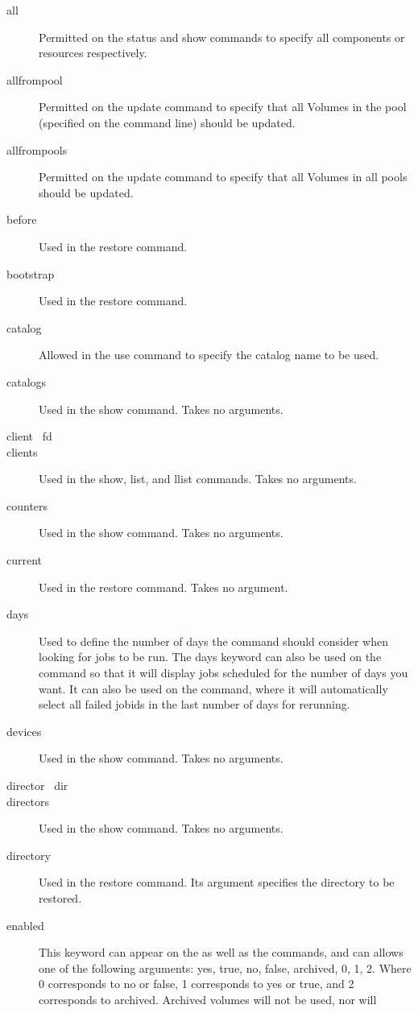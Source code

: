 \begin{description}
\item [all]
  Permitted on the status and show commands to specify all components or
  resources respectively.
\item [allfrompool]
  Permitted on the update command to specify that all Volumes in the
  pool (specified on the command line) should be updated.
\item [allfrompools]
  Permitted on the update command to specify that all Volumes in all
  pools should be updated.
\item [before]
  Used in the restore command.
\item [bootstrap]
  Used in the restore command.
\item [catalog]
  Allowed in the use command to specify the catalog name
  to be used.
\item [catalogs]
  Used in the show command. Takes no arguments.
\item [client \textbar\ fd]
\item [clients]
  Used in the show, list, and llist commands. Takes no arguments.
\item [counters]
  Used in the show command. Takes no arguments.
\item [current]
  Used in the restore command. Takes no argument.
\item [days]
  Used to define the number of days the  command
  should consider when looking for jobs to be run.  The days keyword
  can also be used on the  command so that it will display
  jobs scheduled for the number of days you want. It can also be used on the   command, where it will automatically select all failed jobids in the last number of days for rerunning.
\item [devices]
  Used in the show command. Takes no arguments.
\item [director \textbar\ dir]
\item [directors]
  Used in the show command. Takes no arguments.
\item [directory]
  Used in the restore command. Its argument specifies the directory
  to be restored.
\item [enabled]
  This keyword can appear on the  as well
  as the  commands, and can
  allows one of the following arguments: yes, true, no, false, archived,
  0, 1, 2.  Where 0 corresponds to no or false, 1 corresponds to yes or true, and
  2 corresponds to archived.  Archived volumes will not be used, nor will

\end{description}
